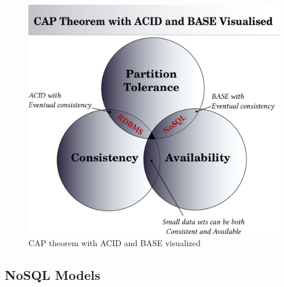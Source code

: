 \begin{description}
    \begin{figure}[htbp]
      \begin{center}
        \includegraphics[width=0.8\maxwidth]{../figures/cap-nist.pdf}
        \caption{CAP theorem with ACID and BASE visualized\label{fig:cap}}
       \end{center}
    \end{figure}
\end{description}

\subsection{NoSQL Models}

